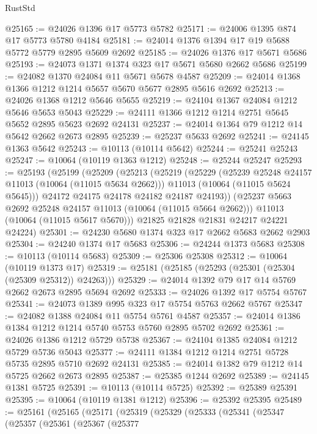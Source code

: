 \begin{lexlean}{RustStd}
\begin{coremodule}
@25165 := @24026 @1396 @17 @5773 @5782
@25171 := @24006 @1395 @874 @17 @5773 @5780 @4184
@25181 := @24014 @1376 @1394 @17 @19 @5688 @5772 @5779 @2895 @5609 @2692
@25185 := @24026 @1376 @17 @5671 @5686
@25193 := @24073 @1371 @1374 @323 @17 @5671 @5680 @2662 @5686
@25199 := @24082 @1370 @24084 @11 @5671 @5678 @4587
@25209 := @24014 @1368 @1366 @1212 @1214 @5657 @5670 @5677 @2895 @5616 @2692
@25213 := @24026 @1368 @1212 @5646 @5655
@25219 := @24104 @1367 @24084 @1212 @5646 @5653 @5043
@25229 := @24111 @1366 @1212 @1214 @2751 @5645 @5652 @2895 @5623 @2692 @24131
@25237 := @24014 @1364 @79 @1212 @14 @5642 @2662 @2673 @2895
@25239 := @25237 @5633 @2692
@25241 := @24145 @1363 @5642
@25243 := @10113 (@10114 @5642)
@25244 := @25241 @25243
@25247 := @10064 (@10119 @1363 @1212)
@25248 := @25244 @25247
@25293 := @25193
    (@25199
      (@25209
        (@25213
          (@25219
            (@25229
              (@25239 @25248 @24157 @11013 (@10064 (@11015 @5634 @2662)))
              @11013
              (@10064 (@11015 @5624 @5645)))
            @24172
            @24175
            @24178
            @24182
            @24187
            @24193))
        (@25237 @5663 @2692 @25248 @24157 @11013 (@10064 (@11015 @5664 @2662)))
        @11013
        (@10064 (@11015 @5617 @5670)))
      @21825
      @21828
      @21831
      @24217
      @24221
      @24224)
@25301 := @24230 @5680 @1374 @323 @17 @2662 @5683 @2662 @2903
@25304 := @24240 @1374 @17 @5683
@25306 := @24244 @1373 @5683
@25308 := @10113 (@10114 @5683)
@25309 := @25306 @25308
@25312 := @10064 (@10119 @1373 @17)
@25319 := @25181 (@25185 (@25293 (@25301 (@25304 (@25309 @25312)) @24263)))
@25329 := @24014 @1392 @79 @17 @14 @5769 @2662 @2673 @2895 @5694 @2692
@25333 := @24026 @1392 @17 @5754 @5767
@25341 := @24073 @1389 @995 @323 @17 @5754 @5763 @2662 @5767
@25347 := @24082 @1388 @24084 @11 @5754 @5761 @4587
@25357 := @24014 @1386 @1384 @1212 @1214 @5740 @5753 @5760 @2895 @5702 @2692
@25361 := @24026 @1386 @1212 @5729 @5738
@25367 := @24104 @1385 @24084 @1212 @5729 @5736 @5043
@25377 := @24111 @1384 @1212 @1214 @2751 @5728 @5735 @2895 @5710 @2692 @24131
@25385 := @24014 @1382 @79 @1212 @14 @5725 @2662 @2673 @2895
@25387 := @25385 @1244 @2692
@25389 := @24145 @1381 @5725
@25391 := @10113 (@10114 @5725)
@25392 := @25389 @25391
@25395 := @10064 (@10119 @1381 @1212)
@25396 := @25392 @25395
@25489 := @25161
    (@25165
      (@25171
        (@25319
          (@25329
            (@25333
              (@25341
                (@25347
                  (@25357
                    (@25361
                      (@25367
                        (@25377

\end{coremodule}
\end{lexlean}
